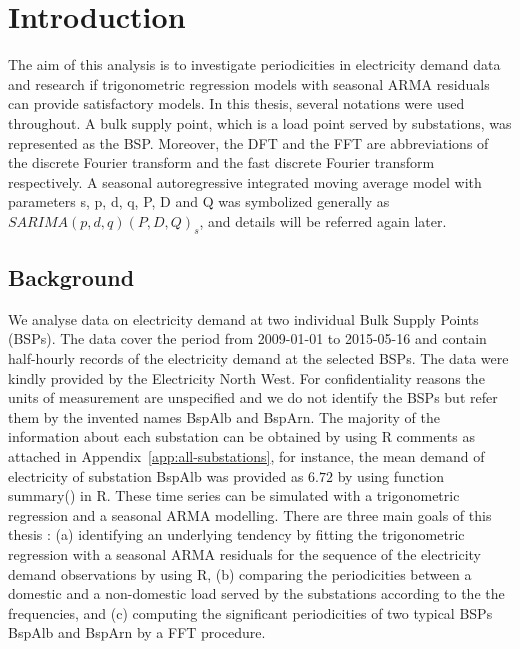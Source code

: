 \documentclass[12pt,msc]{uom_eee_dissertation_casson}
\newcommand{\appref}[1]{Appendix~\ref{#1}}
\begin{document}
\chapter{Introduction}%
\label{chap:introduction}
The aim of this analysis is to investigate periodicities in electricity demand data and research if trigonometric regression models with seasonal ARMA residuals can provide satisfactory models. In this thesis, several notations were used throughout. A bulk supply point, which is a load point served by substations, was represented as the BSP. Moreover, the DFT and the FFT are abbreviations of the discrete Fourier transform and the fast discrete Fourier transform respectively. A seasonal autoregressive integrated moving average model with parameters s, p, d, q, P, D and Q was symbolized generally as $SARIMA(p,d,q)(P,D,Q)_{s}$, and details will be referred again later.

\section{Background} %
\label{sec:background}
We analyse data on electricity demand at two individual Bulk Supply Points (BSPs). The data cover the period from 2009-01-01 to 2015-05-16 and contain half-hourly records of the electricity demand at the selected BSPs. The data were kindly provided by the Electricity North West. For confidentiality reasons the units of measurement are unspecified and we do not identify the BSPs but refer them by the invented names BspAlb and BspArn. The majority of the information about each substation can be obtained by using R comments as attached in \appref{app:all-substations}, for instance, the mean demand of electricity of substation BspAlb was provided as $6.72$ by using function summary() in R. These time series can be simulated with a trigonometric regression and a seasonal ARMA modelling. There are three main goals of this thesis : (a) identifying an underlying tendency by fitting the trigonometric regression with a seasonal ARMA residuals for the sequence of the electricity demand observations by using R, (b) comparing the periodicities between a domestic and a non-domestic load served by the substations according to the the frequencies, and (c) computing the significant periodicities of two typical BSPs BspAlb and BspArn by a FFT procedure.
\end{document}
